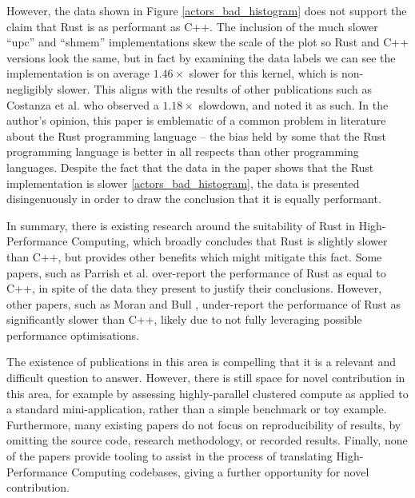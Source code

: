 However, the data shown in Figure \ref{actors_bad_histogram} does not support the claim that Rust is as performant as C++. The inclusion of the much slower ``upc'' and ``shmem'' implementations skew the scale of the plot so Rust and C++ versions look the same, but in fact by examining the data labels we can see the implementation is on average $1.46\times$ slower for this kernel, which is non-negligibly slower. This aligns with the results of other publications such as Costanza et al. who observed a $1.18\times$ slowdown, and noted it as such. In the author's opinion, this paper is emblematic of a common problem in literature about the Rust programming language -- the bias held by some that the Rust programming language is better in all respects than other programming languages. Despite the fact that the data in the paper shows that the Rust implementation is slower \ref{actors_bad_histogram}, the data is presented disingenuously in order to draw the conclusion that it is equally performant.




In summary, there is existing research around the suitability of Rust in High-Performance Computing, which broadly concludes that Rust is slightly slower than C++, but provides other benefits which might mitigate this fact. Some papers, such as Parrish et al. \cite{parrishSafeHPCProductivity2023} over-report the performance of Rust as equal to C++, in spite of the data they present to justify their conclusions. However, other papers, such as Moran and Bull \cite{moranEmergingTechnologiesRust2023}, under-report the performance of Rust as significantly slower than C++, likely due to not fully leveraging possible performance optimisations.

The existence of publications in this area is compelling that it is a relevant and difficult question to answer. However, there is still space for novel contribution in this area, for example by assessing highly-parallel clustered compute as applied to a standard mini-application, rather than a simple benchmark or toy example. Furthermore, many existing papers do not focus on reproducibility of results, by omitting the source code, research methodology, or recorded results. Finally, none of the papers provide tooling to assist in the process of translating High-Performance Computing codebases, giving a further opportunity for novel contribution.
